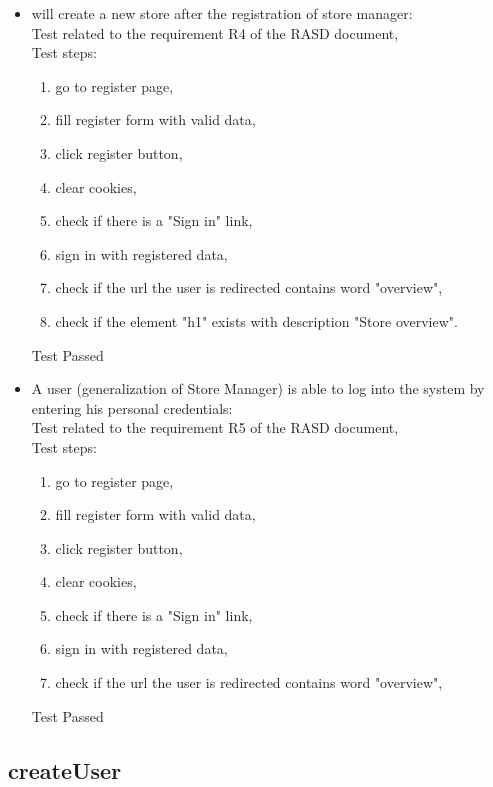 \begin{itemize}
    \item will create a new store after the registration of store manager: \\
    Test related to the requirement R4 of the RASD document, \\
    Test steps:
    \begin{enumerate}
        \item go to register page,
        \item fill register form with valid data,
        \item click register button,
        \item clear cookies,
        \item check if there is a "Sign in" link,
        \item sign in with registered data,
        \item check if the url the user is redirected contains word "overview",
        \item check if the element "h1" exists with description "Store overview".
    \end{enumerate}
    Test Passed \\

    \item A user (generalization of Store Manager) is able to log into the system by entering his personal credentials: \\
    Test related to the requirement R5 of the RASD document, \\
    Test steps:
    \begin{enumerate}
        \item go to register page,
        \item fill register form with valid data,
        \item click register button,
        \item clear cookies,
        \item check if there is a "Sign in" link,
        \item sign in with registered data,
        \item check if the url the user is redirected contains word "overview",
    \end{enumerate}
    Test Passed \\

\end{itemize}
\subsection{createUser}

